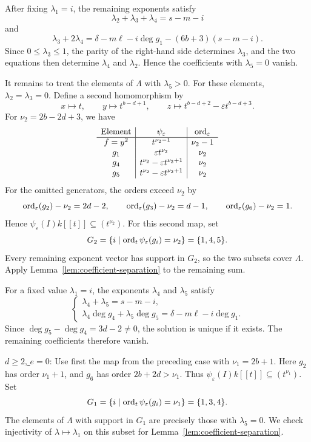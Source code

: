 After fixing $\lambda_1=i$, the remaining exponents satisfy
$$
\lambda_2+\lambda_3+\lambda_4=s-m-i
$$
and
$$
\lambda_3+2\lambda_4
=\delta-m\ell-i\deg g_1-(6b+3)(s-m-i).
$$
Since $0\leq\lambda_3\leq1$, the parity of the right-hand side determines
$\lambda_3$, and the two equations then determine $\lambda_4$ and
$\lambda_2$.  Hence the coefficients with $\lambda_5=0$ vanish.

It remains to treat the elements of $\Lambda$ with $\lambda_5>0$.  For these
elements, $\lambda_2=\lambda_3=0$.  Define a second homomorphism by
$$
x\longmapsto t,\qquad
y\longmapsto t^{b-d+1},\qquad
z\longmapsto t^{b-d+2}-\varepsilon t^{b-d+3}.
$$
For $\nu_2=2b-2d+3$, we have
\[
\begin{array}{c|c|c}
 \text{Element}&\psi_\varepsilon&\operatorname{ord}_\varepsilon\\ \hline
 f=y^2&t^{\nu_2-1}&\nu_2-1\\
 g_1&\varepsilon t^{\nu_2}&\nu_2\\
 g_4&t^{\nu_2}-\varepsilon t^{\nu_2+1}&\nu_2\\
 g_5&t^{\nu_2}-\varepsilon t^{\nu_2+1}&\nu_2
\end{array}
\]
For the omitted generators, the orders exceed $\nu_2$ by
\[
 \operatorname{ord}_\varepsilon(g_2)-\nu_2=2d-2,\qquad
 \operatorname{ord}_\varepsilon(g_3)-\nu_2=d-1,\qquad
 \operatorname{ord}_\varepsilon(g_6)-\nu_2=1.
\]
Hence $\psi_\varepsilon(I)k[[t]]\subseteq(t^{
\nu_2})$. For this second map, set
\[
 G_2=\{i\mid\operatorname{ord}_t\psi_\varepsilon(g_i)=\nu_2\}=\{1,4,5\}.
\]
 Every remaining exponent vector has support in
$G_2$, so the two subsets cover $\Lambda$. Apply
Lemma~\ref{lem:coefficient-separation} to the remaining sum.

For a fixed value $\lambda_1=i$, the exponents $\lambda_4$ and $\lambda_5$
satisfy
$$
\begin{cases}
 \lambda_4+\lambda_5=s-m-i,\\
 \lambda_4\deg g_4+\lambda_5\deg g_5
 =\delta-m\ell-i\deg g_1.
\end{cases}
$$
Since $\deg g_5-\deg g_4=3d-2\neq0$, the solution is unique if it exists.
The remaining coefficients therefore vanish.

\medskip

\noindent
\underline{$d\geq2$, $e=0$}:
Use first the map from the preceding case with $\nu_1=2b+1$.
Here $g_2$ has order $\nu_1+1$, and $g_6$ has order
$2b+2d>\nu_1$. Thus $\psi_\varepsilon(I)k[[t]]\subseteq(t^{\nu_1})$. Set
\[
 G_1=\{i\mid\operatorname{ord}_t\psi_\varepsilon(g_i)=\nu_1\}=\{1,3,4\}.
\]
The elements of $\Lambda$ with support in $G_1$ are precisely those with $\lambda_5=0$. We check injectivity of $\lambda\mapsto\lambda_1$
on this subset for Lemma~\ref{lem:coefficient-separation}.

